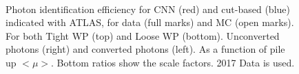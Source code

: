 \begin{figure}[ht]
    \centering
	 \\
    \caption{Photon identification efficiency for CNN (red) and cut-based (blue) indicated with ATLAS, for data (full marks) and MC (open marks). For both Tight WP (top) and Loose WP (bottom). Unconverted photons (right) and converted photons (left). As a function of pile up $<\mu>$. Bottom ratios show the scale factors. 2017 Data is used.}
    \label{fig:gamma:CNN:Zllg:MU}
\end{figure}

